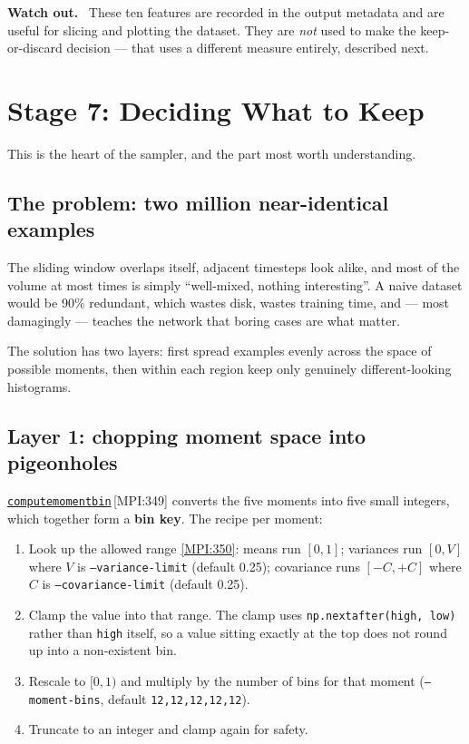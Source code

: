 \documentclass[11pt,a4paper]{report}
\newcommand{\srcbase}{vscode://file/Users/syellapa/Documents/Research/2026/ANSYS/Multi-ScalarPDF}
\newcommand{\srctag}[1]{{\footnotesize\textcolor{TagGray}{[#1]}}}
\newcommand{\Mpi}[2]{\href{\srcbase/EnsightPDFHybridDatasetMPI.py:#1}{\texttt{#2}}\,\srctag{MPI:#1}}
\newcommand{\MpiL}[1]{\href{\srcbase/EnsightPDFHybridDatasetMPI.py:#1}{\srctag{MPI:#1}}}
\newcommand{\code}[1]{\texttt{#1}}
\newcommand{\term}[1]{\textbf{#1}}
\renewcommand{\_}{\origtextunderscore\allowbreak}
\newlength{\calloutwidth}
\newcommand{\calloutOpen}{%
  \par\medskip\noindent
  \setlength{\calloutwidth}{\dimexpr\linewidth-2\fboxsep\relax}%
  \begin{lrbox}{\calloutbox}\begin{minipage}{\calloutwidth}}
\newcommand{\calloutClose}[1]{%
  \end{minipage}\end{lrbox}\colorbox{#1}{\usebox{\calloutbox}}\par\medskip}
\newenvironment{caution}
  {\calloutOpen\textbf{Watch out.}\ }
  {\calloutClose{WarnBG}}
\begin{document}
\begin{caution}
These ten features are recorded in the output metadata and are useful for slicing and
plotting the dataset. They are \emph{not} used to make the keep-or-discard decision --- that
uses a different measure entirely, described next.
\end{caution}

\chapter{Stage 7: Deciding What to Keep}
\label{ch:retention}

This is the heart of the sampler, and the part most worth understanding.

\section{The problem: two million near-identical examples}

The sliding window overlaps itself, adjacent timesteps look alike, and most of the volume at
most times is simply ``well-mixed, nothing interesting''. A naive dataset would be 90\%
redundant, which wastes disk, wastes training time, and --- most damagingly --- teaches the
network that boring cases are what matter.

The solution has two layers: first spread examples evenly across the space of possible
moments, then within each region keep only genuinely different-looking histograms.

\section{Layer 1: chopping moment space into pigeonholes}

\Mpi{349}{compute\_moment\_bin} converts the five moments into five small integers, which
together form a \term{bin key}. The recipe per moment:

\begin{enumerate}
  \item Look up the allowed range \MpiL{350}:
        means run $[0, 1]$; variances run $[0, V]$ where $V$ is \code{--variance-limit}
        (default 0.25); covariance runs $[-C, +C]$ where $C$ is \code{--covariance-limit}
        (default 0.25).
  \item Clamp the value into that range. The clamp uses \code{np.nextafter(high, low)} rather
        than \code{high} itself, so a value sitting exactly at the top does not round up into
        a non-existent bin.
  \item Rescale to $[0, 1)$ and multiply by the number of bins for that moment
        (\code{--moment-bins}, default \code{12,12,12,12,12}).
  \item Truncate to an integer and clamp again for safety.
\end{enumerate}
\end{document}
